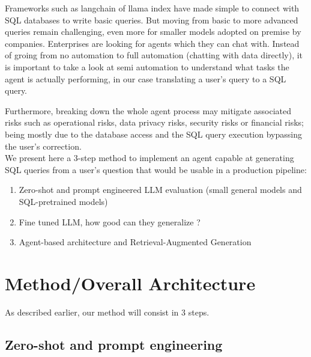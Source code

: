 \documentclass[12pt,a4paper]{article}
\begin{document}
Frameworks such as langchain of llama index have made simple to connect with SQL databases to write basic queries. But moving from basic to more advanced queries remain challenging, even more for smaller models adopted on premise by companies. Enterprises are looking for agents which they can chat with. Instead of groing from no automation to full automation (chatting with data directly), it is important to take a look at semi automation to understand what tasks the agent is actually performing, in our case translating a user's query to a SQL query.

Furthermore, breaking down the whole agent process may mitigate associated risks such as operational risks, data privacy risks, security risks or financial risks; being mostly due to the database access and the SQL query execution bypassing the user's correction.
\\

We present here a 3-step method to implement an agent capable at generating SQL queries from a user's question that would be usable in a production pipeline:
\begin{enumerate}
    \item Zero-shot and prompt engineered LLM evaluation (small general models and SQL-pretrained models)
    \item Fine tuned LLM, how good can they generalize ?
    \item Agent-based architecture and Retrieval-Augmented Generation
\end{enumerate}


\section*{Method/Overall Architecture}

As described earlier, our method will consist in 3 steps.
\subsection*{Zero-shot and prompt engineering}
\end{document}

